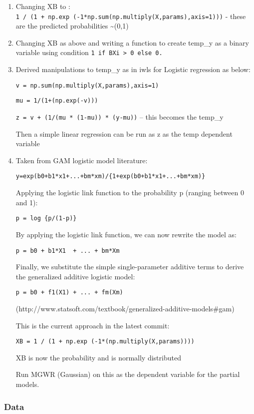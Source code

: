 \documentclass[11pt]{article}
\begin{document}
\begin{enumerate}
\def\labelenumi{\arabic{enumi}.}
\item
  Changing XB to :
  \texttt{1\ /\ (1\ +\ np.exp\ (-1*np.sum(np.multiply(X,params),axis=1)))}
  - these are the predicted probabilities \textasciitilde(0,1)
\item
  Changing XB as above and writing a function to create temp\_y as a
  binary variable using condition
  \texttt{1\ if\ BXi\ \textgreater{}\ 0\ else\ 0.}
\item
  Derived manipulations to temp\_y as in iwls for Logistic regression as
  below:

  \texttt{v\ =\ np.sum(np.multiply(X,params),axis=1)}

  \texttt{mu\ =\ 1/(1+(np.exp(-v)))}

  \texttt{z\ =\ v\ +\ (1/(mu\ *\ (1-mu))\ *\ (y-mu))} -- this becomes
  the temp\_y

  Then a simple linear regression can be run as z as the temp dependent
  variable
\item
  Taken from GAM logistic model literature:

  \texttt{y=exp(b0+b1*x1+...+bm*xm)/\{1+exp(b0+b1*x1+...+bm*xm)\}}

  Applying the logistic link function to the probability p (ranging
  between 0 and 1):

  \texttt{p\textquotesingle{}\ =\ log\ \{p/(1-p)\}}

  By applying the logistic link function, we can now rewrite the model
  as:

  \texttt{p\textquotesingle{}\ =\ b0\ +\ b1*X1\ \ +\ ...\ +\ bm*Xm}

  Finally, we substitute the simple single-parameter additive terms to
  derive the generalized additive logistic model:

  \texttt{p\textquotesingle{}\ =\ b0\ +\ f1(X1)\ +\ ...\ +\ fm(Xm)}

  (http://www.statsoft.com/textbook/generalized-additive-models\#gam)

  This is the current approach in the latest commit:

  \texttt{XB\ =\ 1\ /\ (1\ +\ np.exp\ (-1*(np.multiply(X,params))))}

  XB is now the probability and is normally distributed

  Run MGWR (Gaussian) on this as the dependent variable for the partial
  models.
\end{enumerate}

    \hypertarget{data}{%
\subsubsection{Data}\label{data}}
\end{document}
